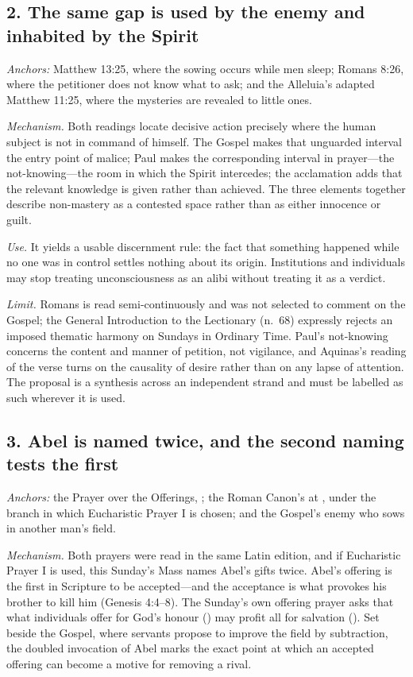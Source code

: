 \subsection*{2. The same gap is used by the enemy and inhabited by the Spirit}

\emph{Anchors:} Matthew 13:25, where the sowing occurs while men sleep; Romans
8:26, where the petitioner does not know what to ask; and the Alleluia's
adapted Matthew 11:25, where the mysteries are revealed to little ones.

\emph{Mechanism.} Both readings locate decisive action precisely where the
human subject is not in command of himself. The Gospel makes that unguarded
interval the entry point of malice; Paul makes the corresponding interval in
prayer---the not-knowing---the room in which the Spirit intercedes; the
acclamation adds that the relevant knowledge is given rather than achieved. The
three elements together describe non-mastery as a contested space rather than
as either innocence or guilt.

\emph{Use.} It yields a usable discernment rule: the fact that something
happened while no one was in control settles nothing about its origin.
Institutions and individuals may stop treating unconsciousness as an alibi
without treating it as a verdict.

\emph{Limit.} Romans is read semi-continuously and was not selected to comment
on the Gospel; the General Introduction to the Lectionary (n.\ 68) expressly
rejects an imposed thematic harmony on Sundays in Ordinary Time. Paul's
not-knowing concerns the content and manner of petition, not vigilance, and
Aquinas's reading of the verse turns on the causality of desire rather than on
any lapse of attention. The proposal is a synthesis across an independent
strand and must be labelled as such wherever it is used.

\subsection*{3. Abel is named twice, and the second naming tests the first}

\emph{Anchors:} the Prayer over the Offerings, ; the
Roman Canon's  at ,
under the branch in which Eucharistic Prayer I is chosen; and the Gospel's
enemy who sows in another man's field.

\emph{Mechanism.} Both prayers were read in the same Latin edition, and if
Eucharistic Prayer I is used, this Sunday's Mass names Abel's gifts twice.
Abel's offering is the first in Scripture to be accepted---and the acceptance
is what provokes his brother to kill him (Genesis 4:4--8). The Sunday's own
offering prayer asks that what individuals offer for God's honour
() may profit all for salvation (). Set
beside the Gospel, where servants propose to improve the field by subtraction,
the doubled invocation of Abel marks the exact point at which an accepted
offering can become a motive for removing a rival.

